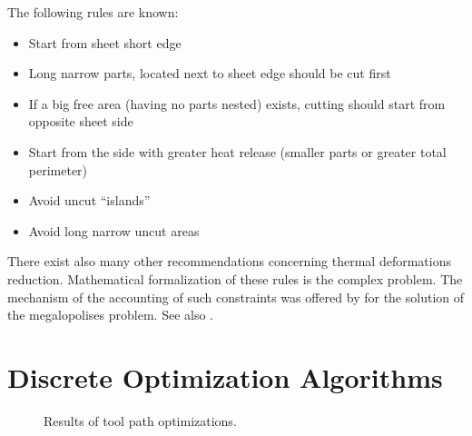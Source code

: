 \documentclass{../download/tPRS2e}
\begin{document}
The following rules are known:

\begin{itemize}
\item Start from sheet short edge
\item Long narrow parts, located next to sheet edge should be cut first
\item If a big free area (having no parts nested) exists, cutting should start from opposite sheet side
\item Start from the side with greater heat release (smaller parts or greater total perimeter)
\item Avoid uncut “islands”
\item Avoid long narrow uncut areas
\end{itemize}

There exist also many other recommendations concerning thermal deformations reduction.
Mathematical formalization of these rules is the complex problem.
The mechanism of the accounting of such constraints was offered by \cite{2013}
for the solution of the megalopolises problem. See also \cite{2015}.

\section{Discrete Optimization Algorithms}

\begin{figure}
\begin{center}
\caption{Results of tool path optimizations.} \label{nesting-results}
\end{center}
\end{figure}
\end{document}
